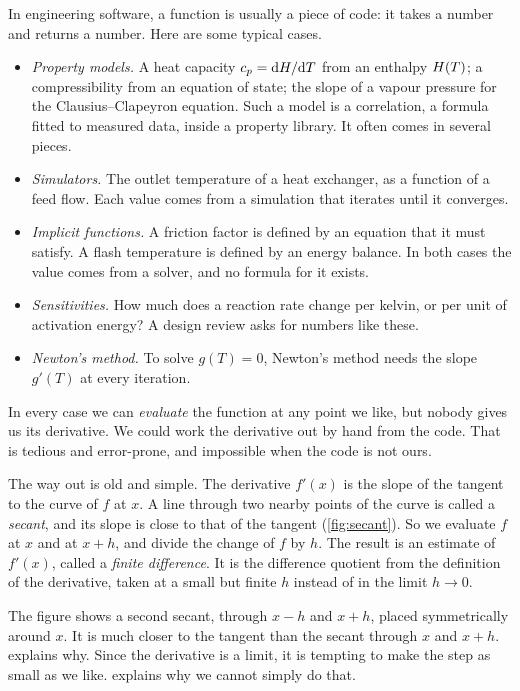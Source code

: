 In engineering software, a function is usually a piece of code: it takes a number and returns a number. Here are
some typical cases.
\begin{itemize}
  \item \emph{Property models.} A heat capacity $c_p = \mathrm{d} H / \mathrm{d} T$ from an enthalpy $H(T)$; a
    compressibility from an equation of state; the slope of a vapour pressure for the Clausius--Clapeyron equation.
    Such a model is a correlation, a formula fitted to measured data, inside a property library. It often comes in
    several pieces.
  \item \emph{Simulators.} The outlet temperature of a heat exchanger, as a function of a feed flow. Each value
    comes from a simulation that iterates until it converges.
  \item \emph{Implicit functions.} A friction factor is defined by an equation that it must satisfy. A flash
    temperature is defined by an energy balance. In both cases the value comes from a solver, and no formula for it
    exists.
  \item \emph{Sensitivities.} How much does a reaction rate change per kelvin, or per unit of activation energy? A
    design review asks for numbers like these.
  \item \emph{Newton's method.} To solve $g(T) = 0$, Newton's method needs the slope $g'(T)$ at every iteration.
\end{itemize}
In every case we can \emph{evaluate} the function at any point we like, but nobody gives us its derivative. We could
work the derivative out by hand from the code. That is tedious and error-prone, and impossible when the code is not
ours.

The way out is old and simple. The derivative $f'(x)$ is the slope of the tangent to the curve of $f$ at $x$. A line
through two nearby points of the curve is called a \emph{secant}, and its slope is close to that of the tangent
(\cref{fig:secant}). So we evaluate $f$ at $x$ and at $x + h$, and divide the change of $f$ by $h$. The result is an estimate
of $f'(x)$, called a \emph{finite difference}. It is the difference quotient from the definition of the derivative,
taken at a small but finite $h$ instead of in the limit $h \to 0$.

The figure shows a second secant, through $x - h$ and $x + h$, placed symmetrically around $x$. It is much closer to
the tangent than the secant through $x$ and $x + h$.  explains why. Since the derivative is a limit,
it is tempting to make the step as small as we like.  explains why we cannot simply do that.

